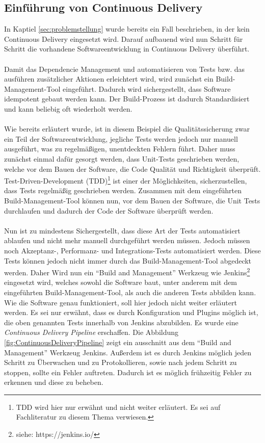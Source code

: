 \subsection{Einführung von Continuous Delivery}
\label{subsec:EinfuehrungCD}
In Kaptiel \ref{sec:problemstellung}  wurde bereits ein Fall beschrieben, in der kein Continuous Delivery eingesetzt wird. Darauf aufbauend wird nun Schritt für Schritt die vorhandene Softwareentwicklung in Continuous Delivery überführt.
\\\\
Damit das Dependencie Management und automatisieren von Tests bzw. das ausführen zusätzlicher Aktionen erleichtert wird, wird zunächst ein Build-Management-Tool eingeführt. Dadurch wird sichergestellt, dass Software idempotent gebaut werden kann. Der Build-Prozess ist dadurch Standardisiert und kann beliebig oft wiederholt werden.
\\\\
Wie bereits erläutert wurde, ist in diesem Beispiel die Qualitätssicherung zwar ein Teil der Softwareentwicklung, jegliche Tests werden jedoch nur manuell ausgeführt, was zu regelmäßigen, unentdeckten Fehlern führt. Daher muss zunächst einmal dafür gesorgt werden, dass Unit-Tests geschrieben werden, welche vor dem Bauen der Software, die Code Qualität und Richtigkeit überprüft.  Test-Driven-Development (TDD)\footnote{TDD wird hier nur erwähnt und nicht weiter erläutert. Es sei auf Fachliteratur zu diesem Thema verwiesen.} ist einer der Möglichkeiten, sicherzustellen, dass Tests regelmäßig geschrieben werden. Zusammen mit dem eingeführten Build-Management-Tool können nun, vor dem Bauen der Software, die Unit Tests durchlaufen und dadurch der Code der Software überprüft werden.
\\\\
Nun ist zu mindestens Sichergestellt, dass diese Art der Tests automatisiert ablaufen und nicht mehr manuell durchgeführt werden müssen. Jedoch müssen noch Akzeptanz-, Performanz- und Integrations-Tests automatisiert werden. Diese Tests können jedoch nicht immer durch das Build-Management-Tool abgedeckt werden. Daher Wird nun ein "`Build and Management"' Werkzeug wie Jenkins\footnote{siehe: https://jenkins.io/} eingesetzt wird, welches sowohl die Software baut, unter anderem mit dem eingeführten Build-Management-Tool, als auch die anderen Tests abbilden kann. Wie die Software genau funktioniert, soll hier jedoch nicht weiter erläutert werden. Es sei nur erwähnt, dass es durch Konfiguration und Plugins möglich ist, die oben genannten Tests innerhalb von Jenkins abzubilden. Es wurde eine \textit{Continuous Delivery Pipeline} erschaffen. Die Abbildung \ref{fig:ContinuousDeliveryPipeline}  zeigt ein ausschnitt aus dem "`Build and Management"' Werkzeug Jenkins. Außerdem ist es durch Jenkins möglich jeden Schritt zu Überwachen und zu Protokollieren, sowie nach jedem Schritt zu stoppen, sollte ein Fehler auftreten. Dadurch ist es möglich frühzeitig Fehler zu erkennen und diese zu beheben.
